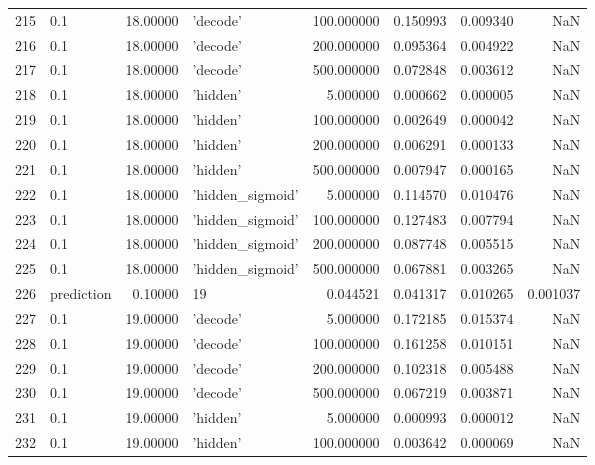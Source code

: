 \documentclass[10pt,a4paper]{article}
\begin{document}
\begin{tabular}{llrlrrrr}
215  &         0.1 &  18.00000 &           'decode' &  100.000000 &  0.150993 &  0.009340 &       NaN \\
216  &         0.1 &  18.00000 &           'decode' &  200.000000 &  0.095364 &  0.004922 &       NaN \\
217  &         0.1 &  18.00000 &           'decode' &  500.000000 &  0.072848 &  0.003612 &       NaN \\
218  &         0.1 &  18.00000 &           'hidden' &    5.000000 &  0.000662 &  0.000005 &       NaN \\
219  &         0.1 &  18.00000 &           'hidden' &  100.000000 &  0.002649 &  0.000042 &       NaN \\
220  &         0.1 &  18.00000 &           'hidden' &  200.000000 &  0.006291 &  0.000133 &       NaN \\
221  &         0.1 &  18.00000 &           'hidden' &  500.000000 &  0.007947 &  0.000165 &       NaN \\
222  &         0.1 &  18.00000 &   'hidden\_sigmoid' &    5.000000 &  0.114570 &  0.010476 &       NaN \\
223  &         0.1 &  18.00000 &   'hidden\_sigmoid' &  100.000000 &  0.127483 &  0.007794 &       NaN \\
224  &         0.1 &  18.00000 &   'hidden\_sigmoid' &  200.000000 &  0.087748 &  0.005515 &       NaN \\
225  &         0.1 &  18.00000 &   'hidden\_sigmoid' &  500.000000 &  0.067881 &  0.003265 &       NaN \\
226  &  prediction &   0.10000 &                 19 &    0.044521 &  0.041317 &  0.010265 &  0.001037 \\
227  &         0.1 &  19.00000 &           'decode' &    5.000000 &  0.172185 &  0.015374 &       NaN \\
228  &         0.1 &  19.00000 &           'decode' &  100.000000 &  0.161258 &  0.010151 &       NaN \\
229  &         0.1 &  19.00000 &           'decode' &  200.000000 &  0.102318 &  0.005488 &       NaN \\
230  &         0.1 &  19.00000 &           'decode' &  500.000000 &  0.067219 &  0.003871 &       NaN \\
231  &         0.1 &  19.00000 &           'hidden' &    5.000000 &  0.000993 &  0.000012 &       NaN \\
232  &         0.1 &  19.00000 &           'hidden' &  100.000000 &  0.003642 &  0.000069 &       NaN \\

\end{tabular}
\end{document}
